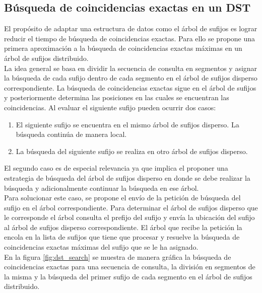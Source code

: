 \documentclass[12pt,a4paper]{article}
\begin{document}
\subsection{Búsqueda de coincidencias exactas en un DST}
El propósito de adaptar una estructura de datos como el árbol de sufijos es lograr reducir el tiempo de búsqueda de coincidencias
exactas. Para ello se propone una primera aproximación a la búsqueda de coincidencias exactas máximas en un árbol de sufijos 
distribuido.\\
La idea general se basa en dividir la secuencia de consulta en segmentos y asignar la búsqueda de cada sufijo dentro de cada
segmento en el árbol de sufijos disperso correspondiente. La búsqueda de coincidencias exactas sigue en el árbol de sufijos y 
posteriormente determina las posiciones en las cuales se encuentran las coincidencias. Al evaluar el siguiente sufijo pueden
ocurrir dos casos:
\begin{enumerate}
  \item El siguiente sufijo se encuentra en el mismo árbol de sufijos disperso. La búsqueda continúa de manera local.
  \item La búsqueda del siguiente sufijo se realiza en otro árbol de sufijos disperso.
\end{enumerate}
El segundo caso es de especial relevancia ya que implica el proponer una estrategia de búsqueda del árbol de sufijos disperso
en donde se debe realizar la búsqueda y adicionalmente continuar la búsqueda en ese árbol.\\
Para solucionar este caso, se propone el envío de la petición de búsqueda del sufijo en el árbol correspondiente. Para determinar
el árbol de sufijos disperso que le corresponde el árbol consulta el prefijo del sufijo y envía la ubicación del sufijo al árbol 
de sufijos disperso correspondiente. El árbol que recibe la petición la encola en la lista de sufijos que tiene que procesar y 
resuelve la búsqueda de coincidencias exactas máximas del sufijo que se le ha asignado.\\
En la figura \ref{fig:dst_search} se muestra de manera gráfica la búsqueda de coincidencias exactas para una secuencia de consulta,
la división en segmentos de la misma y la búsqueda del primer sufijo de cada segmento en el árbol de sufijos distribuido.
\end{document}
